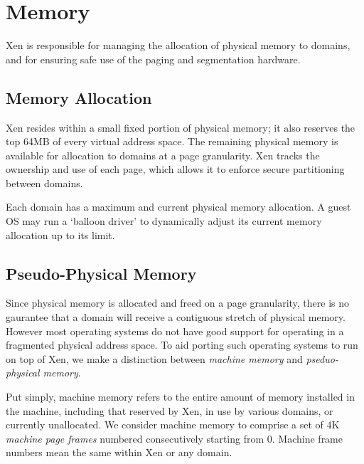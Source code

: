 \documentclass[11pt,twoside,final,openright]{xenstyle}
\begin{document}
\chapter{Memory}

Xen is responsible for managing the allocation of physical memory to
domains, and for ensuring safe use of the paging and segmentation
hardware.


\section{Memory Allocation}


Xen resides within a small fixed portion of physical memory; it also
reserves the top 64MB of every virtual address space. The remaining
physical memory is available for allocation to domains at a page
granularity.  Xen tracks the ownership and use of each page, which
allows it to enforce secure partitioning between domains.

Each domain has a maximum and current physical memory allocation. 
A guest OS may run a `balloon driver' to dynamically adjust its 
current memory allocation up to its limit. 



\section{Pseudo-Physical Memory}

Since physical memory is allocated and freed on a page granularity,
there is no gaurantee that a domain will receive a contiguous stretch
of physical memory. However most operating systems do not have good
support for operating in a fragmented physical address space. To aid
porting such operating systems to run on top of Xen, we make a
distinction between \emph{machine memory} and \emph{pseduo-physical
memory}.

Put simply, machine memory refers to the entire amount of memory
installed in the machine, including that reserved by Xen, in use by
various domains, or currently unallocated. We consider machine memory
to comprise a set of 4K \emph{machine page frames} numbered
consecutively starting from 0. Machine frame numbers mean the same
within Xen or any domain.
\end{document}

